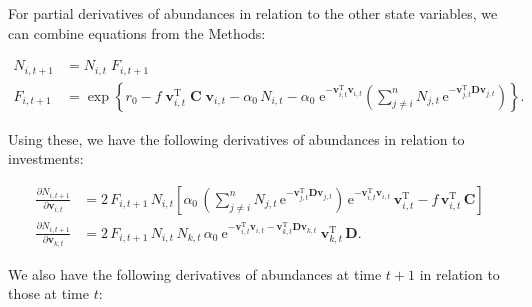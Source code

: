 For partial derivatives of abundances in relation to the other state variables,
we can combine equations from the Methods:

\begin{equation} \label{eq:fitness-full}
\begin{split}
    N_{i,t+1} &= N_{i,t} \; F_{i,t+1} \\
    F_{i,t+1} &= \exp \left\{
        r_0 - f \; \mathbf{v}_{i,t}^{\textrm{T}} \; \mathbf{C} \; \mathbf{v}_{i,t} -
        \alpha_0 \, N_{i,t} -
        \alpha_0 \;\textrm{e}^{- \mathbf{v}_{i,t}^{\textrm{T}} \mathbf{v}_{i,t} } \left( 
            \sum_{j \ne i}^{n}{ N_{j,t} \, \textrm{e}^{
                - \mathbf{v}_{j,t}^{\textrm{T}}
                \mathbf{D} \mathbf{v}_{j,t} } }
        \right)
        \right\}
    \textrm{.}
\end{split}
\end{equation}





Using these, we have the following derivatives of abundances in relation
to investments:

\begin{equation*}
\begin{split}
    \frac{ \partial N_{i,t+1} }{ \partial \mathbf{v}_{i,t} } &= 
        2 \, F_{i,t+1} \,  N_{i,t}
        \left[
            \alpha_0 \, 
            \left( 
                \sum_{j \ne i}^{n}{ N_{j,t} \, \textrm{e}^{
                    - \mathbf{v}_{j,t}^{\textrm{T}}
                    \mathbf{D} \mathbf{v}_{j,t} } }
            \right)
            \, \text{e}^{ -\mathbf{v}_{i,t}^{\text{T}}
            \mathbf{v}_{i,t} } \, \mathbf{v}_{i,t}^{\text{T}}
            - f \, \mathbf{v}_{i,t}^{\text{T}} \, \mathbf{C}
        \right] \\
    \frac{ \partial N_{i,t+1} }{ \partial \mathbf{v}_{k,t} } &= 
        2 \, F_{i,t+1} \, N_{i,t} \, N_{k,t} \, \alpha_0 \: 
        \text{e}^{ -\mathbf{v}_{i,t}^{\text{T}} \mathbf{v}_{i,t} -
            \mathbf{v}_{k,t}^{\text{T}} \mathbf{D} \mathbf{v}_{k,t} } \:
        \mathbf{v}_{k,t}^{\text{T}} \, \mathbf{D}
    \textrm{.}
\end{split}
\end{equation*}

We also have the following derivatives of abundances at time $t+1$ in relation
to those at time $t$:

